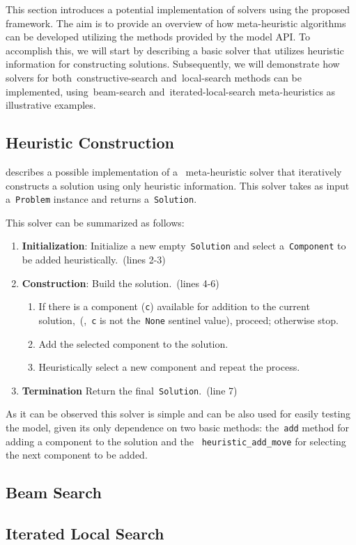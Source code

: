 This section introduces a potential implementation of solvers using the proposed
framework. The aim is to provide an overview of how meta-heuristic algorithms
can be developed utilizing the methods provided by the model API. To accomplish
this, we will start by describing a basic solver that utilizes heuristic
information for constructing solutions. Subsequently, we will demonstrate how
solvers for both~\acrshort{constructive-search} and~\acrshort{local-search}
methods can be implemented, using~\acrshort{beam-search}
and~\acrshort{iterated-local-search} meta-heuristics as illustrative examples.

\subsection{Heuristic Construction}
\label{subsec:heuristic-construction}

 describes a possible implementation of a
~\acrshort{meta-heuristic} solver that iteratively constructs a solution using
only heuristic information. This solver takes as input a~\texttt{Problem}
instance and returns a~\texttt{Solution}.



This solver can be summarized as follows:

\begin{enumerate}
  \item \textbf{Initialization}: Initialize a new empty~\texttt{Solution}
        and select a~\texttt{Component} to be added heuristically.~(lines 2-3)
  \item \textbf{Construction}: Build the solution.~(lines 4-6)
        \begin{enumerate}
          \item If there is a component (\texttt{c}) available for addition to the
                current solution,~(\ie{},~\texttt{c} is not the~\texttt{None}
                sentinel value), proceed; otherwise stop.
          \item Add the selected component to the solution.
          \item Heuristically select a new component and repeat the process.
        \end{enumerate}
  \item \textbf{Termination} Return the final~\texttt{Solution}.~(line 7)
\end{enumerate}

As it can be observed this solver is simple and can be also used for easily
testing the model, given its only dependence on two basic methods:
the~\texttt{add} method for adding a component to the solution and the
~\texttt{heuristic\_add\_move} for selecting the next component to be added.


\subsection{Beam Search}
\label{subsec:beam-search-solver}


\subsection{Iterated Local Search}
\label{subsec:ils}
